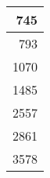 \documentclass[dvipsnames]{beamer}
\theoremstyle{plain}
\begin{document}
\begin{frame}[fragile]
\begin{columns}[b]
    \begin{tiny}
    \begin{table}
      \begin{tabular}{|r|}\hline
                745\\\hline
                793\\\hline
               1070\\\hline
               1485\\\hline
               2557\\\hline
               2861\\\hline
               3578\\\hline
      \end{tabular}
    \end{table}
    \end{tiny}
  \end{columns}
\end{frame}
\end{document}

